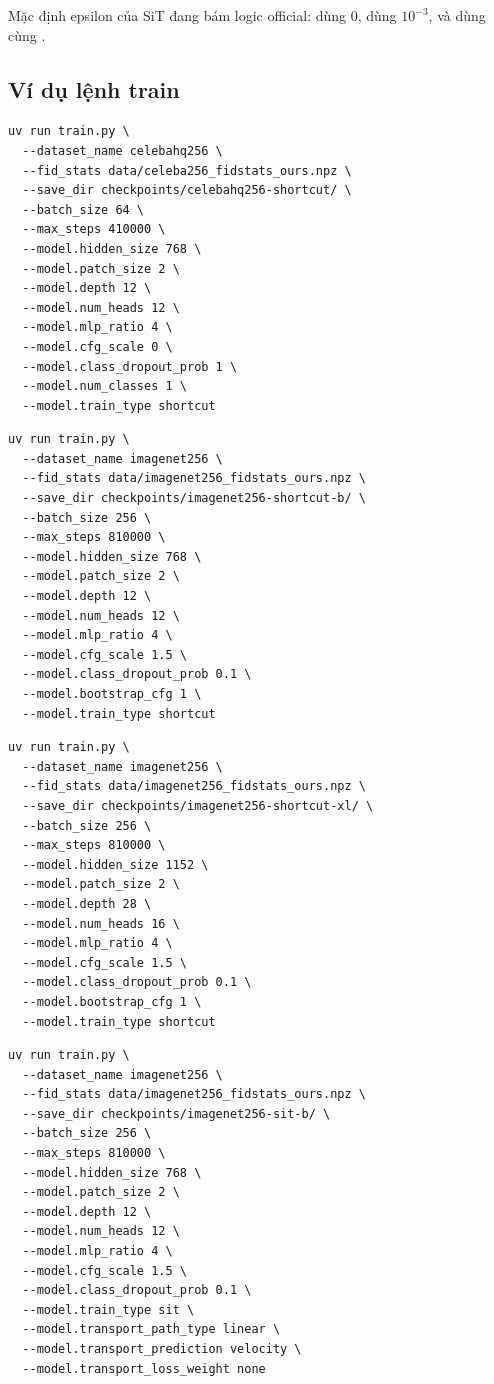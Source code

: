 \noindent Mặc định epsilon của SiT đang bám logic official:
 dùng \(0\),
 dùng \(10^{-3}\),
và  dùng  cùng .

\subsection{Ví dụ lệnh train}

\begin{lstlisting}[style=bashstyle,caption={Train shortcut trên CelebA-HQ}]
uv run train.py \
  --dataset_name celebahq256 \
  --fid_stats data/celeba256_fidstats_ours.npz \
  --save_dir checkpoints/celebahq256-shortcut/ \
  --batch_size 64 \
  --max_steps 410000 \
  --model.hidden_size 768 \
  --model.patch_size 2 \
  --model.depth 12 \
  --model.num_heads 12 \
  --model.mlp_ratio 4 \
  --model.cfg_scale 0 \
  --model.class_dropout_prob 1 \
  --model.num_classes 1 \
  --model.train_type shortcut
\end{lstlisting}

\begin{lstlisting}[style=bashstyle,caption={Train shortcut trên ImageNet-256}]
uv run train.py \
  --dataset_name imagenet256 \
  --fid_stats data/imagenet256_fidstats_ours.npz \
  --save_dir checkpoints/imagenet256-shortcut-b/ \
  --batch_size 256 \
  --max_steps 810000 \
  --model.hidden_size 768 \
  --model.patch_size 2 \
  --model.depth 12 \
  --model.num_heads 12 \
  --model.mlp_ratio 4 \
  --model.cfg_scale 1.5 \
  --model.class_dropout_prob 0.1 \
  --model.bootstrap_cfg 1 \
  --model.train_type shortcut
\end{lstlisting}

\begin{lstlisting}[style=bashstyle,caption={Train shortcut trên ImageNet-256 với DiT-XL}]
uv run train.py \
  --dataset_name imagenet256 \
  --fid_stats data/imagenet256_fidstats_ours.npz \
  --save_dir checkpoints/imagenet256-shortcut-xl/ \
  --batch_size 256 \
  --max_steps 810000 \
  --model.hidden_size 1152 \
  --model.patch_size 2 \
  --model.depth 28 \
  --model.num_heads 16 \
  --model.mlp_ratio 4 \
  --model.cfg_scale 1.5 \
  --model.class_dropout_prob 0.1 \
  --model.bootstrap_cfg 1 \
  --model.train_type shortcut
\end{lstlisting}

\begin{lstlisting}[style=bashstyle,caption={Train baseline SiT trên ImageNet-256}]
uv run train.py \
  --dataset_name imagenet256 \
  --fid_stats data/imagenet256_fidstats_ours.npz \
  --save_dir checkpoints/imagenet256-sit-b/ \
  --batch_size 256 \
  --max_steps 810000 \
  --model.hidden_size 768 \
  --model.patch_size 2 \
  --model.depth 12 \
  --model.num_heads 12 \
  --model.mlp_ratio 4 \
  --model.cfg_scale 1.5 \
  --model.class_dropout_prob 0.1 \
  --model.train_type sit \
  --model.transport_path_type linear \
  --model.transport_prediction velocity \
  --model.transport_loss_weight none
\end{lstlisting}

